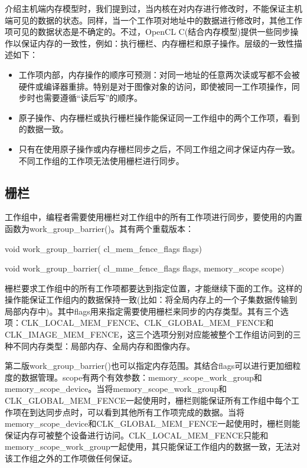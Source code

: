 介绍主机端内存模型时，我们提到过，当内核在对内存进行修改时，不能保证主机端可见的数据的状态。同样，当一个工作项对地址中的数据进行修改时，其他工作项可见的数据状态是不确定的。不过，OpenCL C(结合内存模型)提供一些同步操作以保证内存的一致性，例如：执行栅栏、内存栅栏和原子操作。层级的一致性描述如下：

\begin{itemize}
\item 工作项内部，内存操作的顺序可预测：对同一地址的任意两次读或写都不会被硬件或编译器重排。特别是对于图像对象的访问，即使被同一工作项操作，同步时也需要遵循“读后写”的顺序。
\item 原子操作、内存栅栏或执行栅栏操作能保证同一工作组中的两个工作项，看到的数据一致。
\item 只有在使用原子操作或内存栅栏同步之后，不同工作组之间才保证内存一致。不同工作组的工作项无法使用栅栏进行同步。
\end{itemize}

\subsection{栅栏}

工作组中，编程者需要使用栅栏对工作组中的所有工作项进行同步，要使用的内置函数为work\_\allowbreak{}group\_\allowbreak{}barrier()。其有两个重载版本：

\begin{codebox}[cpp]
void
work_group_barrier(
  cl_mem_fence_flags flags)

void
work_group_barrier(
  cl_mme_fence_flags flags,
  memory_scope scope)
\end{codebox}

栅栏要求工作组中的所有工作项都要达到指定位置，才能继续下面的工作。这样的操作能保证工作组内的数据保持一致(比如：将全局内存上的一个子集数据传输到局部内存中)。其中flags用来指定需要使用栅栏来同步的内存类型。其有三个选项：CLK\_\allowbreak{}LOCAL\_\allowbreak{}MEM\_\allowbreak{}FENCE、CLK\_\allowbreak{}GLOBAL\_\allowbreak{}MEM\_\allowbreak{}FENCE和CLK\_\allowbreak{}IMAGE\_\allowbreak{}MEM\_\allowbreak{}FENCE，这三个选项分别对应能被整个工作组访问到的三种不同内存类型：局部内存、全局内存和图像内存。

第二版work\_\allowbreak{}group\_\allowbreak{}barrier()也可以指定内存范围。其结合flags可以进行更加细粒度的数据管理。scope有两个有效参数：memory\_\allowbreak{}scope\_\allowbreak{}work\_\allowbreak{}group和memory\_\allowbreak{}scope\_\allowbreak{}device。当将memory\_\allowbreak{}scope\_\allowbreak{}work\_\allowbreak{}group和CLK\_\allowbreak{}GLOBAL\_\allowbreak{}MEM\_\allowbreak{}FENCE一起使用时，栅栏则能保证所有工作组中每个工作项在到达同步点时，可以看到其他所有工作项完成的数据。当将memory\_\allowbreak{}scope\_\allowbreak{}device和CLK\_\allowbreak{}GLOBAL\_\allowbreak{}MEM\_\allowbreak{}FENCE一起使用时，栅栏则能保证内存可被整个设备进行访问。CLK\_\allowbreak{}LOCAL\_\allowbreak{}MEM\_\allowbreak{}FENCE只能和memory\_\allowbreak{}scope\_\allowbreak{}work\_\allowbreak{}group一起使用，其只能保证工作组内的数据一致，无法对该工作组之外的工作项做任何保证。

